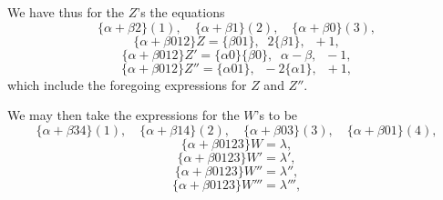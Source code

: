 \documentclass[11pt,a4paper]{article}
\begin{document}
\medskip

We have thus for the $Z$'s the equations
\[
\{\alpha + \beta 2\}(1),\quad \{\alpha + \beta 1\}(2),\quad \{\alpha + \beta 0\}(3),
\]
\[
\{\alpha + \beta 012\}Z = \{\beta 01\},\;\; 2\{\beta 1\},\;\; +1,
\]
\[
\{\alpha + \beta 012\}Z' = \{\alpha 0\}\{\beta 0\},\;\; \alpha - \beta,\;\; -1,
\]
\[
\{\alpha + \beta 012\}Z'' = \{\alpha 01\},\;\; -2\{\alpha 1\},\;\; +1,
\]
which include the foregoing expressions for $Z$ and $Z''$.

\medskip

We may then take the expressions for the $W$'s to be
\[
\{\alpha + \beta 34\}(1),\quad \{\alpha + \beta 14\}(2),\quad \{\alpha + \beta 03\}(3),\quad \{\alpha + \beta 01\}(4),
\]
\[
\{\alpha + \beta 0123\}W = \lambda,
\]
\[
\{\alpha + \beta 0123\}W' = \lambda',
\]
\[
\{\alpha + \beta 0123\}W'' = \lambda'',
\]
\[
\{\alpha + \beta 0123\}W''' = \lambda''',
\]
\end{document}
